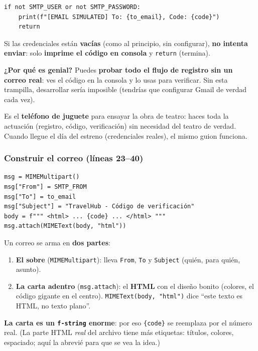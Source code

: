 \documentclass[11pt,a4paper]{article}
\begin{document}
\begin{lstlisting}
if not SMTP_USER or not SMTP_PASSWORD:
    print(f"[EMAIL SIMULATED] To: {to_email}, Code: {code}")
    return
\end{lstlisting}

Si las credenciales están \textbf{vacías} (como al principio, sin configurar), \textbf{no
intenta enviar}: solo \textbf{imprime el código en consola} y \texttt{return} (termina).

\textbf{¿Por qué es genial?} Puedes \textbf{probar todo el flujo de registro sin un correo
real}: ves el código en la consola y lo usas para verificar. Sin esta trampilla, desarrollar
sería imposible (tendrías que configurar Gmail de verdad cada vez).

\begin{analogia}
Es el \textbf{teléfono de juguete} para ensayar la obra de teatro: haces toda la actuación
(registro, código, verificación) sin necesidad del teatro de verdad. Cuando llegue el día del
estreno (credenciales reales), el mismo guion funciona.
\end{analogia}

\subsubsection{Construir el correo (líneas 23--40)}

\begin{lstlisting}
msg = MIMEMultipart()
msg["From"] = SMTP_FROM
msg["To"] = to_email
msg["Subject"] = "TravelHub - Código de verificación"
body = f""" <html> ... {code} ... </html> """
msg.attach(MIMEText(body, "html"))
\end{lstlisting}

Un correo se arma en \textbf{dos partes}:
\begin{enumerate}
    \item \textbf{El sobre} (\texttt{MIMEMultipart}): lleva \texttt{From}, \texttt{To} y
    \texttt{Subject} (quién, para quién, asunto).
    \item \textbf{La carta adentro} (\texttt{msg.attach}): el \textbf{HTML} con el diseño
    bonito (colores, el código gigante en el centro). \texttt{MIMEText(body, "html")} dice
    ``este texto es HTML, no texto plano''.
\end{enumerate}

\textbf{La carta es un \texttt{f-string} enorme}: por eso \texttt{\{code\}} se reemplaza por el
número real. (La parte HTML \emph{real} del archivo tiene más etiquetas: títulos, colores,
espaciado; aquí la abrevié para que se vea la idea.)
\end{document}
